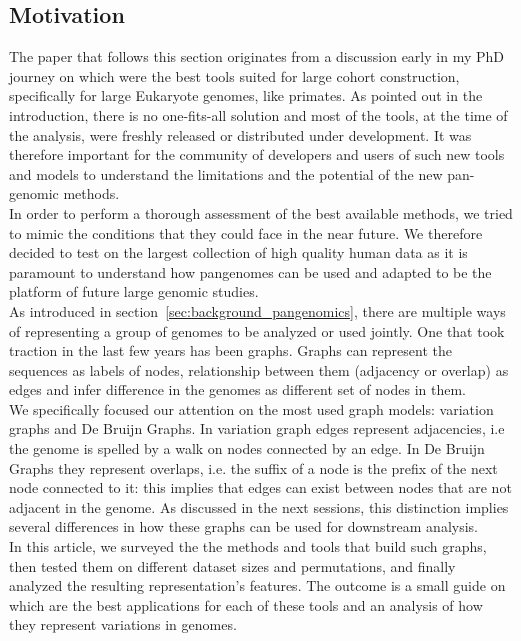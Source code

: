 \subsection{Motivation}
The paper that follows this section originates from a discussion early in my PhD journey on which were the best tools suited for large cohort \pangenome construction, specifically for large 
Eukaryote genomes, like primates. As pointed out in the introduction, there is no one-fits-all solution and most of the tools, at the time of the analysis, were freshly released or distributed under development. It was therefore important for the community of developers and users of such new tools and models to understand the limitations and the potential of the new pan-genomic methods.\\
In order to perform a thorough assessment of the best available methods, we tried to mimic the conditions that they could face in the near future. We therefore decided to test on the largest collection of high quality human data as it is paramount to understand how pangenomes can be used and adapted to be the platform of future large genomic studies.\\
As introduced in section~\ref{sec:background_pangenomics}, there are multiple ways of representing a group of genomes to be analyzed or used jointly. One that took traction in the last few years has been graphs. Graphs can represent the sequences as labels of nodes, relationship between them (adjacency or overlap) as edges and infer difference in the genomes as different set of nodes in them.\\
We specifically focused our attention on the most used graph models: variation graphs and De Bruijn Graphs. In variation graph edges represent adjacencies, i.e the genome is spelled by a walk on nodes connected by an edge. In De Bruijn Graphs they represent overlaps, i.e. the suffix of a node is the prefix of the next node connected to it: this implies that edges can exist between nodes that are not adjacent in the genome. As discussed in the next sessions, this distinction implies several differences in how these graphs can be used for downstream analysis. \\ 
In this article, we surveyed the the methods and tools that build such graphs, then tested them on different dataset sizes and permutations, and finally analyzed the resulting representation's features. The outcome is a small guide on which are the best applications for each of these tools and an analysis of how they represent variations in genomes. \\
\newpage

